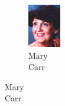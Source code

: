 \begin{figure}[H]
\begin{subfigure}[b]{0.1\textwidth}
                \includegraphics[width=\textwidth]{mugs/CarrMary2}
                \caption*{Mary \\ Carr}
        \end{subfigure}
\end{figure}